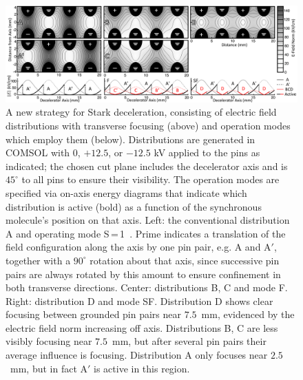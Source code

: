 \documentclass[%
 reprint,
 amsmath,amssymb,
 aps,
prl,
]{revtex4-1}
\begin{document}
\begin{figure}[t!]
\includegraphics[width=\linewidth]{Configurations/pinpairformal5.png}%
\caption{
A new strategy for Stark deceleration, consisting of electric field distributions with transverse focusing (above) and operation modes which employ them (below). 
Distributions are generated in COMSOL with $0$, $+12.5$, or $-12.5$ kV applied to the pins as indicated; the chosen cut plane includes the decelerator axis and is $45^\circ$ to all pins to ensure their visibility.
The operation modes are specified via on-axis energy diagrams that indicate which distribution is active (bold) as a function of the synchronous molecule's position on that axis.
Left: the conventional distribution A and operating mode S\,=\,1~\cite{VanDeMeerakker2005a}.
Prime indicates a translation of the field configuration along the axis by one pin pair, e.g. A and A$'$, together with a $90^\circ$ rotation about that axis, since successive pin pairs are always rotated by this amount to ensure confinement in both transverse directions.
Center: distributions B, C and mode F.
Right: distribution D and mode SF.
Distribution D shows clear focusing between grounded pin pairs near $7.5$~mm, evidenced by the electric field norm increasing off axis.
Distributions B, C are less visibly focusing near $7.5$~mm, but after several pin pairs their average influence is focusing.
Distribution A only focuses near $2.5$~mm, but in fact A$'$ is active in this region.
\vspace{-4mm}
}
\label{fig:chargecartoon}
\end{figure}
\end{document}
